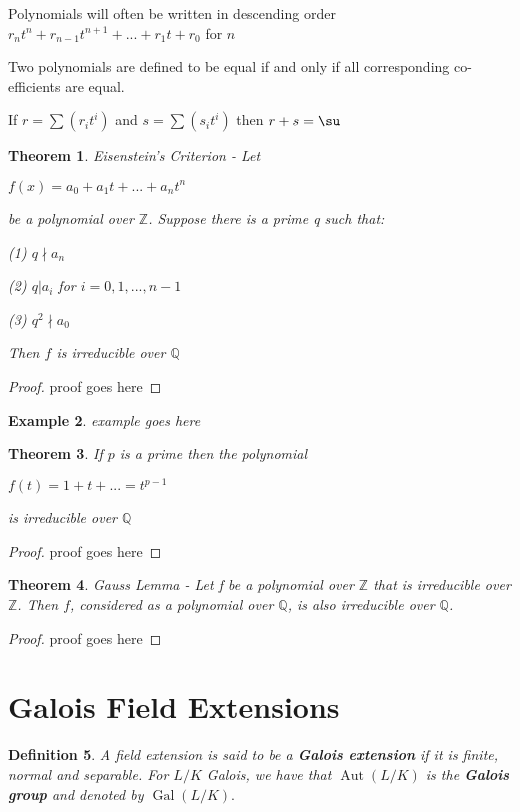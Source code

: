 \documentclass[12pt]{article}
\newtheorem{theorem}{Theorem}
\newtheorem{definition}[theorem]{Definition}
\newtheorem{example}[theorem]{Example}
\newcommand{\Gal}{\operatorname{Gal}}
\newcommand{\Aut}{\operatorname{Aut}}
\newcommand{\Z}{\mathbb Z}
\newcommand{\Q}{\mathbb Q}
\begin{document}
Polynomials will often be written in descending order $r_n t^n + r_{n-1} t^{n+1} + ... + r_1 t + r_0$ for $n$

Two polynomials are defined to be equal if and only if all corresponding co-efficients are equal.

If $r = \sum (r_i t^i)$ and $s = \sum (s_i t^i)$ then $r+s = \su$

\begin{theorem}
    Eisenstein's Criterion - Let 
    
    $f(x) = a_0 + a_1 t + ... + a_n t^n$
    
    be a polynomial over $\Z$. Suppose there is a prime q such that:
    
    (1) $q \nmid a_n$

    (2) $q | a_i$ for $i = {0, 1,..., n-1}$

    (3) $q^2 \nmid a_0$

    Then $f$ is irreducible over $\Q$
\end{theorem}

\begin{proof}
proof goes here
\end{proof}

\begin{example}
    example goes here
\end{example}

\begin{theorem}
    If $p$ is a prime then the polynomial

    $f(t) = 1 + t + ... = t^{p-1}$

    is irreducible over $\Q$
\end{theorem}

\begin{proof}
    proof goes here
\end{proof}

\begin{theorem}
    Gauss Lemma - Let f be a polynomial over $\Z$ that is irreducible over $\Z$. Then $f$, considered as a polynomial over $\Q$, is also irreducible over $\Q$.
\end{theorem}

\begin{proof}
    proof goes here
\end{proof}

\section{Galois Field Extensions}
\begin{definition}
A field extension is said to be a \textbf{Galois extension} if it is finite, normal and separable. For $L/K$ Galois, we have that $\Aut(L/K)$ is the \textbf{Galois group} and denoted by $\Gal(L/K).$
\end{definition}
\end{document}
